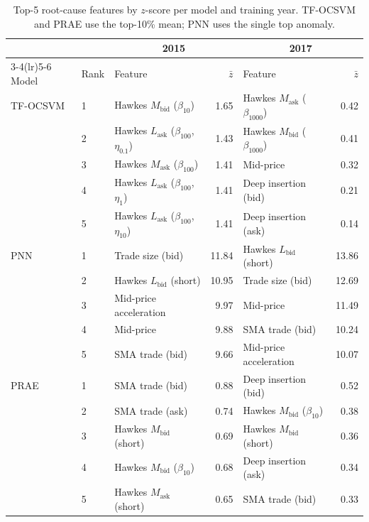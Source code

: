 \documentclass[11pt]{report}
\begin{document}
\begin{table}[H]
\centering
\caption{Top-5 root-cause features by $z$-score per model and training year. TF-OCSVM and PRAE use the top-10\% mean; PNN uses the single top anomaly.}
\label{tab:root_cause}
\small
\begin{tabular}{ll lr lr}
\toprule
& & \multicolumn{2}{c}{\textbf{2015}} & \multicolumn{2}{c}{\textbf{2017}} \\
\cmidrule(lr){3-4}\cmidrule(lr){5-6}
Model & Rank & Feature & $\bar{z}$ & Feature & $\bar{z}$ \\
\midrule
TF-OCSVM & 1 & Hawkes $M_{\text{bid}}$ ($\beta_{10}$)     & 1.65 & Hawkes $M_{\text{ask}}$ ($\beta_{1000}$)    & 0.42 \\
            & 2 & Hawkes $L_{\text{ask}}$ ($\beta_{100}$, $\eta_{0.1}$)  & 1.43 & Hawkes $M_{\text{bid}}$ ($\beta_{1000}$)    & 0.41 \\
            & 3 & Hawkes $M_{\text{ask}}$ ($\beta_{100}$)    & 1.41 & Mid-price                                    & 0.32 \\
            & 4 & Hawkes $L_{\text{ask}}$ ($\beta_{100}$, $\eta_{1}$) & 1.41 & Deep insertion (bid)                         & 0.21 \\
            & 5 & Hawkes $L_{\text{ask}}$ ($\beta_{100}$, $\eta_{10}$) & 1.41 & Deep insertion (ask)                         & 0.14 \\
\midrule
PNN         & 1 & Trade size (bid)                           & 11.84 & Hawkes $L_{\text{bid}}$ (short)              & 13.86 \\
            & 2 & Hawkes $L_{\text{bid}}$ (short)            & 10.95 & Trade size (bid)                             & 12.69 \\
            & 3 & Mid-price acceleration                     & 9.97  & Mid-price                                    & 11.49 \\
            & 4 & Mid-price                                  & 9.88  & SMA trade (bid)                              & 10.24 \\
            & 5 & SMA trade (bid)                            & 9.66  & Mid-price acceleration                       & 10.07 \\
\midrule
PRAE        & 1 & SMA trade (bid)                            & 0.88 & Deep insertion (bid)                         & 0.52 \\
            & 2 & SMA trade (ask)                            & 0.74 & Hawkes $M_{\text{bid}}$ ($\beta_{10}$)       & 0.38 \\
            & 3 & Hawkes $M_{\text{bid}}$ (short)            & 0.69 & Hawkes $M_{\text{bid}}$ (short)              & 0.36 \\
            & 4 & Hawkes $M_{\text{bid}}$ ($\beta_{10}$)     & 0.68 & Deep insertion (ask)                         & 0.34 \\
            & 5 & Hawkes $M_{\text{ask}}$ (short)            & 0.65 & SMA trade (bid)                              & 0.33 \\
\bottomrule
\end{tabular}
\end{table}
\end{document}

